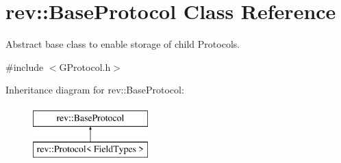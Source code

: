 \hypertarget{classrev_1_1_base_protocol}{}\section{rev\+::Base\+Protocol Class Reference}
\label{classrev_1_1_base_protocol}


Abstract base class to enable storage of child Protocols.  




{\ttfamily \#include $<$G\+Protocol.\+h$>$}

Inheritance diagram for rev\+::Base\+Protocol\+:\begin{figure}[H]
\begin{center}
\leavevmode
\includegraphics[height=2.000000cm]{classrev_1_1_base_protocol}
\end{center}
\end{figure}
